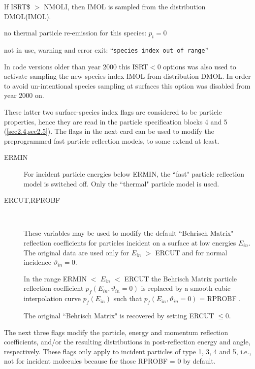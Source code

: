 \begin{description}
\begin{description}
                If ISRT\$ $>$  NMOLI, then IMOL is sampled from the distribution DMOL(IMOL).
          \item[$= 0$] no thermal particle re-emission for this species: $p_t = 0 $
          \item[$< 0$] not in use, warning and error exit:
                ``\lstinline|species index out of range|'' 

                In code versions older than year 2000 this ISRT$<$0 options was also used to
                activate sampling the new species index IMOL from distribution DMOL.
                In order to avoid un-intentional species sampling at surfaces this option was
                disabled from year 2000 on.
        \end{description}
\end{description}
These latter two surface-species index flags are considered to be particle
properties, hence they are read in the particle specification blocks 4 and 5
(\cref{sec2.4,sec2.5}).
The flags in the next card can be used to modify the preprogrammed fast
particle reflection models, to some extend at least.
\begin{description}
  \item[ERMIN] For incident particle energies below ERMIN, the ``fast" particle
        reflection model is switched off.
        Only the ``thermal" particle model is used.
  \item[ERCUT,RPROBF] ~ 

        These variables may be used to modify the default ``Behrisch Matrix" reflection
        coefficients for particles incident on a surface at low energies $E_{in}$.
        The original data \cite{kn:Behrisch} are used only for $E_{in}$ $>$ ERCUT and
        for normal incidence $\vartheta_{in} = 0 $.

        In the range ERMIN $<$ $E_{in}$ $<$ ERCUT the Behrisch Matrix particle
        reflection coefficient $p_f(E_{in}, \vartheta_{in} = 0)$ is replaced by a
        smooth cubic interpolation curve $p_f (E_{in})$ such that $p_f(E_{in},
          \vartheta_{in} = 0)$ = RPROBF .

        The original ``Behrisch Matrix" is recovered by setting ERCUT $\le 0$.
\end{description}
The next three flags modify the particle, energy and momentum reflection
coefficients, and/or the resulting distributions in post-reflection energy and
angle, respectively.
These flags only apply to incident particles of type 1, 3, 4 and 5, i.e., not
for incident molecules because for those RPROBF = 0 by default.
